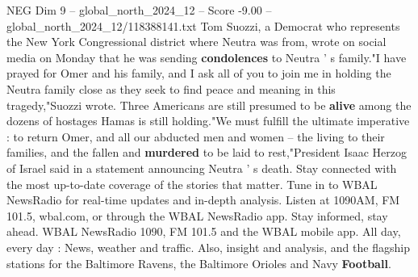 \begin{textsample}{NEG Dim 9 – global\_north\_2024\_12 – Score -9.00 – global\_north\_2024\_12/118388141.txt}
Tom Suozzi, a Democrat who represents the New York Congressional district where Neutra was from, wrote on social media on Monday that he was sending \textbf{condolences} to Neutra ' s family."I have prayed for Omer and his family, and I ask all of you to join me in holding the Neutra family close as they seek to find peace and meaning in this tragedy,"Suozzi wrote.
Three Americans are still presumed to be \textbf{alive} among the dozens of hostages Hamas is still holding."We must fulfill the ultimate imperative : to return Omer, and all our abducted men and women -- the living to their families, and the fallen and \textbf{murdered} to be laid to rest,"President Isaac Herzog of Israel said in a statement announcing Neutra ' s death.
Stay connected with the most up-to-date coverage of the stories that matter.
Tune in to WBAL NewsRadio for real-time updates and in-depth analysis.
Listen at 1090AM, FM 101.5, wbal.com, or through the WBAL NewsRadio app.
Stay informed, stay ahead.
WBAL NewsRadio 1090, FM 101.5 and the WBAL mobile app.
All day, every day : News, weather and traffic.
Also, insight and analysis, and the flagship stations for the Baltimore Ravens, the Baltimore Orioles and Navy \textbf{Football}.

\end{textsample}
